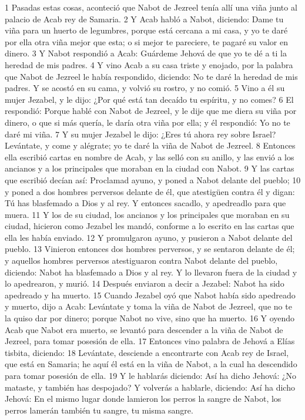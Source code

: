 1 Pasadas estas cosas, aconteció que Nabot de Jezreel tenía allí una viña junto al palacio de Acab rey de Samaria.
2 Y Acab habló a Nabot, diciendo: Dame tu viña para un huerto de legumbres, porque está cercana a mi casa, y yo te daré por ella otra viña mejor que esta; o si mejor te pareciere, te pagaré su valor en dinero.
3 Y Nabot respondió a Acab: Guárdeme Jehová de que yo te dé a ti la heredad de mis padres.
4 Y vino Acab a su casa triste y enojado, por la palabra que Nabot de Jezreel le había respondido, diciendo: No te daré la heredad de mis padres. Y se acostó en su cama, y volvió su rostro, y no comió.
5 Vino a él su mujer Jezabel, y le dijo: ¿Por qué está tan decaído tu espíritu, y no comes?
6 El respondió: Porque hablé con Nabot de Jezreel, y le dije que me diera su viña por dinero, o que si más quería, le daría otra viña por ella; y él respondió: Yo no te daré mi viña.
7 Y su mujer Jezabel le dijo: ¿Eres tú ahora rey sobre Israel? Levántate, y come y alégrate; yo te daré la viña de Nabot de Jezreel.
8 Entonces ella escribió cartas en nombre de Acab, y las selló con su anillo, y las envió a los ancianos y a los principales que moraban en la ciudad con Nabot.
9 Y las cartas que escribió decían así: Proclamad ayuno, y poned a Nabot delante del pueblo;
10 y poned a dos hombres perversos delante de él, que atestigüen contra él y digan: Tú has blasfemado a Dios y al rey. Y entonces sacadlo, y apedreadlo para que muera.
11 Y los de su ciudad, los ancianos y los principales que moraban en su ciudad, hicieron como Jezabel les mandó, conforme a lo escrito en las cartas que ella les había enviado.
12 Y promulgaron ayuno, y pusieron a Nabot delante del pueblo.
13 Vinieron entonces dos hombres perversos, y se sentaron delante de él; y aquellos hombres perversos atestiguaron contra Nabot delante del pueblo, diciendo: Nabot ha blasfemado a Dios y al rey. Y lo llevaron fuera de la ciudad y lo apedrearon, y murió.
14 Después enviaron a decir a Jezabel: Nabot ha sido apedreado y ha muerto.
15 Cuando Jezabel oyó que Nabot había sido apedreado y muerto, dijo a Acab: Levántate y toma la viña de Nabot de Jezreel, que no te la quiso dar por dinero; porque Nabot no vive, sino que ha muerto.
16 Y oyendo Acab que Nabot era muerto, se levantó para descender a la viña de Nabot de Jezreel, para tomar posesión de ella.
17 Entonces vino palabra de Jehová a Elías tisbita, diciendo:
18 Levántate, desciende a encontrarte con Acab rey de Israel, que está en Samaria; he aquí él está en la viña de Nabot, a la cual ha descendido para tomar posesión de ella.
19 Y le hablarás diciendo: Así ha dicho Jehová: ¿No mataste, y también has despojado? Y volverás a hablarle, diciendo: Así ha dicho Jehová: En el mismo lugar donde lamieron los perros la sangre de Nabot, los perros lamerán también tu sangre, tu misma sangre.
